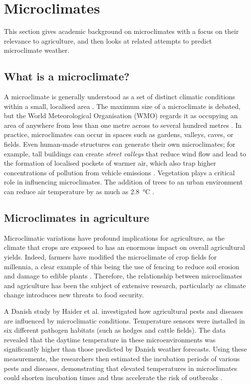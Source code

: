 \section{Microclimates}

This section gives academic background on microclimates with a focus on their
relevance to agriculture, and then looks at related attempts to predict
microclimate weather.

\subsection{What is a microclimate?}

A microclimate is generally understood as a set of distinct climatic conditions
within a small, localised area \cite{MetOffice2023}. The maximum size of a
microclimate is debated, but the World Meteorological Organisation (WMO) regards
it as occupying an area of anywhere from less than one metre across to several
hundred metres \cite{wmo2024}.  In practice, microclimates can occur in spaces
such as gardens, valleys, caves, or fields. Even human-made structures can
generate their own microclimates; for example, tall buildings can create
\emph{street valleys} that reduce wind flow and lead to the formation of
localised pockets of warmer air, which also trap higher concentrations of
pollution from vehicle emissions \cite{yang2023}. Vegetation plays a critical
role in influencing microclimates. The addition of trees to an urban environment
can reduce air temperature by as much as \SI{2.8}{\degreeCelsius}
\cite{lai2019}.

\subsection{Microclimates in agriculture}

Microclimatic variations have profound implications for agriculture, as the
climate that crops are exposed to has an enormous impact on overall agricultural
yields. Indeed, farmers have modified the microclimate of crop fields for
millennia, a clear example of this being the use of fencing to reduce soil
erosion and damage to edible plants \cite{cleugh1998}. Therefore, the
relationship between microclimates and agriculture has been the subject of
extensive research, particularly as climate change introduces new threats to
food security.

A Danish study by Haider et al. investigated how agricultural pests and diseases
are influenced by microclimatic conditions. Temperature sensors were installed
in six different pathogen habitats (such as hedges and cattle fields). The data
revealed that the daytime temperature in these microenvironments was
significantly higher than those predicted by Danish weather forecasts. Using
these measurements, the researchers then estimated the incubation periods of
various pests and diseases, demonstrating that elevated temperatures in
microclimates could shorten incubation times and thus accelerate the risk of
outbreaks \cite{haider2017}.

